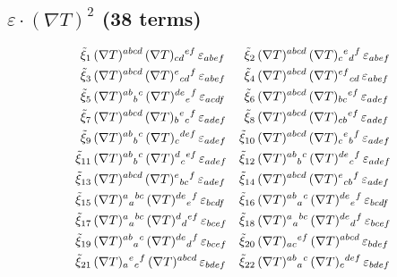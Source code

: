 \documentclass[12pt,a4paper]{article}
\newcommand{\del}{\nabla}            %
\newcommand{\eps}{\varepsilon}       %
\begin{document}
\subsection{$\eps \cdot (\del T)^2$ (38 terms)}
{\small
\begin{align}
  \tilde{\xi}_1&\, (\del T)^{abcd}\,(\del T)_{cd}{}^{ef}\,\eps_{abef}  &
  \tilde{\xi}_2&\, (\del T)^{abcd}\,(\del T)_{c}{}^{e}{}_{d}{}^{f}\,\eps_{abef}  \notag\\
  \tilde{\xi}_3&\, (\del T)^{abcd}\,(\del T)^{e}{}_{cd}{}^{f}\,\eps_{abef}  &
  \tilde{\xi}_4&\, (\del T)^{abcd}\,(\del T)^{ef}{}_{cd}\,\eps_{abef}  \notag\\
  \tilde{\xi}_5&\, (\del T)^{ab}{}_{b}{}^{c}\,(\del T)^{de}{}_{e}{}^{f}\,\eps_{acdf}  &
  \tilde{\xi}_6&\, (\del T)^{abcd}\,(\del T)_{bc}{}^{ef}\,\eps_{adef}  \notag\\
  \tilde{\xi}_7&\, (\del T)^{abcd}\,(\del T)_{b}{}^{e}{}_{c}{}^{f}\,\eps_{adef}  &
  \tilde{\xi}_8&\, (\del T)^{abcd}\,(\del T)_{cb}{}^{ef}\,\eps_{adef}  \notag\\
  \tilde{\xi}_9&\, (\del T)^{ab}{}_{b}{}^{c}\,(\del T)_{c}{}^{def}\,\eps_{adef}  &
  \tilde{\xi}_{10}&\, (\del T)^{abcd}\,(\del T)_{c}{}^{e}{}_{b}{}^{f}\,\eps_{adef}  \notag\\
  \tilde{\xi}_{11}&\, (\del T)^{ab}{}_{b}{}^{c}\,(\del T)^{d}{}_{c}{}^{ef}\,\eps_{adef}  &
  \tilde{\xi}_{12}&\, (\del T)^{ab}{}_{b}{}^{c}\,(\del T)^{de}{}_{c}{}^{f}\,\eps_{adef}  \notag\\
  \tilde{\xi}_{13}&\, (\del T)^{abcd}\,(\del T)^{e}{}_{bc}{}^{f}\,\eps_{adef}  &
  \tilde{\xi}_{14}&\, (\del T)^{abcd}\,(\del T)^{e}{}_{cb}{}^{f}\,\eps_{adef}  \notag\\
  \tilde{\xi}_{15}&\, (\del T)^{a}{}_{a}{}^{bc}\,(\del T)^{de}{}_{e}{}^{f}\,\eps_{bcdf}  &
  \tilde{\xi}_{16}&\, (\del T)^{ab}{}_{a}{}^{c}\,(\del T)^{de}{}_{e}{}^{f}\,\eps_{bcdf}  \notag\\
  \tilde{\xi}_{17}&\, (\del T)^{a}{}_{a}{}^{bc}\,(\del T)^{d}{}_{d}{}^{ef}\,\eps_{bcef}  &
  \tilde{\xi}_{18}&\, (\del T)^{a}{}_{a}{}^{bc}\,(\del T)^{de}{}_{d}{}^{f}\,\eps_{bcef}  \notag\\
  \tilde{\xi}_{19}&\, (\del T)^{ab}{}_{a}{}^{c}\,(\del T)^{de}{}_{d}{}^{f}\,\eps_{bcef}  &
  \tilde{\xi}_{20}&\, (\del T)_{ac}{}^{ef}\,(\del T)^{abcd}\,\eps_{bdef}  \notag\\
  \tilde{\xi}_{21}&\, (\del T)_{a}{}^{e}{}_{c}{}^{f}\,(\del T)^{abcd}\,\eps_{bdef}  &
  \tilde{\xi}_{22}&\, (\del T)^{ab}{}_{a}{}^{c}\,(\del T)_{c}{}^{def}\,\eps_{bdef}  \notag\\

\end{align}}
\end{document}
